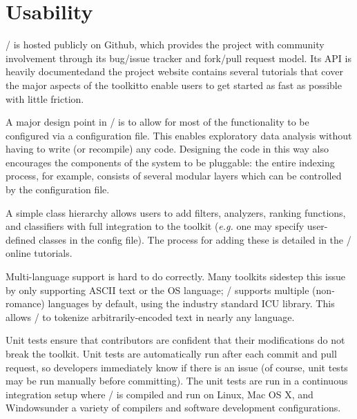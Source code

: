 \section{Usability}

\meta/ is hosted publicly on Github\footnotemark[1], which provides
the project with community involvement through its bug/issue tracker and
fork/pull request model. Its API is heavily documented\footnotemark[2] and the
project website contains several tutorials that cover the major aspects of
the toolkit\footnotemark[3] to enable users to get started as fast as
possible with little friction.


A major design point in \meta/ is to allow for most of the functionality to be
configured via a configuration file. This enables exploratory data analysis
without having to write (or recompile) any code. Designing the code in this way
also encourages the components of the system to be pluggable: the entire
indexing process, for example, consists of several modular layers which can be
controlled by the configuration file.

A simple class hierarchy allows users to add filters, analyzers, ranking
functions, and classifiers with full integration to the toolkit (\emph{e.g.} one
may specify user-defined classes in the config file). The process for adding
these is detailed in the \meta/ online tutorials.

Multi-language support is hard to do correctly. Many toolkits sidestep this
issue by only supporting ASCII text or the OS language; \meta/ supports multiple
(non-romance) languages by default, using the industry standard ICU
library\footnotemark[4]. This allows \meta/ to tokenize arbitrarily-encoded text
in nearly any language.


Unit tests ensure that contributors are confident that their modifications do
not break the toolkit. Unit tests are automatically run after each commit and
pull request, so developers immediately know if there is an issue (of course,
unit tests may be run manually before committing). The unit tests are run in a
continuous integration setup where \meta/ is compiled and run on
Linux\footnotemark[77], Mac OS X\footnotemark[77], and Windows\footnotemark[78]
under a variety of compilers and software development configurations.

